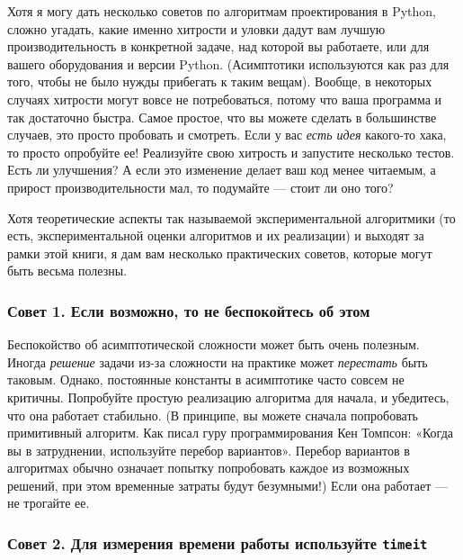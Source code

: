 Хотя я могу дать несколько советов по алгоритмам проектирования в Python, сложно угадать, какие именно хитрости и уловки дадут вам лучшую производительность в конкретной задаче, над которой вы работаете, или для вашего оборудования и версии Python. (Асимптотики используются как раз для того, чтобы не было нужды прибегать к таким вещам). Вообще, в некоторых случаях хитрости могут вовсе не потребоваться, потому что ваша программа и так достаточно быстра. Самое простое, что вы можете сделать в большинстве случаев, это просто пробовать и смотреть. Если у вас \textit{есть идея} какого-то хака, то просто опробуйте ее! Реализуйте свою хитрость и запустите несколько тестов. Есть ли улучшения? А если это изменение делает ваш код менее читаемым, а прирост производительности мал, то подумайте — стоит ли оно того?

\noindent{}


Хотя теоретические аспекты так называемой экспериментальной алгоритмики (то есть, экспериментальной оценки алгоритмов и их реализации) и выходят за рамки этой книги, я дам вам несколько практических советов, которые могут быть весьма полезны.

\subsubsection*{Совет 1. Если возможно, то не беспокойтесь об этом}

Беспокойство об асимптотической сложности может быть очень полезным. Иногда \textit{решение} задачи из-за сложности на практике может \textit{перестать} быть таковым. Однако, постоянные константы в асимптотике часто совсем не критичны. Попробуйте простую реализацию алгоритма для начала, и убедитесь, что она работает стабильно. (В принципе, вы можете сначала попробовать примитивный алгоритм. Как писал гуру программирования Кен Томпсон: «Когда вы в затруднении, используйте перебор вариантов». Перебор вариантов в алгоритмах обычно означает попытку попробовать каждое из возможных решений, при этом временные затраты будут безумными!) Если она работает — не трогайте ее.

\subsubsection*{Совет 2. Для измерения времени работы используйте \texttt{timeit}}

